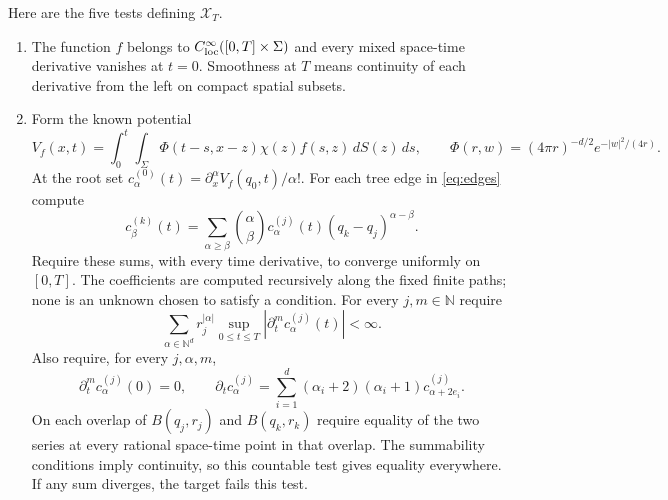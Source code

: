 \documentclass[11pt]{article}
\theoremstyle{remark}
\newcommand{\N}{\mathbb N}
\newcommand{\dt}{\partial_t}
\newcommand{\calX}{\mathcal X}
\begin{document}
Here are the five tests defining $\calX_T$.
\begin{enumerate}[label=\textnormal{(\Alph*)},leftmargin=*]
\item\label{test:A}
The function $f$ belongs to $C^\infty_{\rm loc}([0,T]\times\Sigma)$
and every mixed space-time derivative vanishes at $t=0$.
Smoothness at $T$ means continuity of each derivative from the left on
compact spatial subsets.
\item\label{test:B}
Form the known potential
\begin{equation}\label{eq:potential}
 V_f(x,t)=\int_0^t\int_\Sigma
       \Phi(t-s,x-z)\chi(z)f(s,z)\,dS(z)\,ds,\qquad
 \Phi(r,w)=(4\pi r)^{-d/2}e^{-|w|^2/(4r)}.
\end{equation}
At the root set
$c^{(0)}_\alpha(t)=\partial_x^\alpha V_f(q_0,t)/\alpha!$.
For each tree edge in \eqref{eq:edges} compute
\begin{equation}\label{eq:translation}
 c^{(k)}_\beta(t)=
 \sum_{\alpha\geq\beta}\binom{\alpha}{\beta}
 c^{(j)}_\alpha(t)(q_k-q_j)^{\alpha-\beta}.
\end{equation}
Require these sums, with every time derivative, to converge uniformly on
$[0,T]$. The coefficients are computed recursively along the fixed finite
paths; none is an unknown chosen to satisfy a condition.
For every $j,m\in\N$ require
\begin{equation}\label{eq:budget}
 \sum_{\alpha\in\N^d}r_j^{|\alpha|}
      \sup_{0\leq t\leq T}|\partial_t^m c^{(j)}_\alpha(t)|<\infty.
\end{equation}
Also require, for every $j,\alpha,m$,
\begin{equation}\label{eq:recurrence}
 \partial_t^m c^{(j)}_\alpha(0)=0,\qquad
 \dt c^{(j)}_\alpha=
 \sum_{i=1}^d(\alpha_i+2)(\alpha_i+1)c^{(j)}_{\alpha+2e_i}.
\end{equation}
On each overlap of $B(q_j,r_j)$ and $B(q_k,r_k)$ require equality of
the two series at every rational space-time point in that overlap.
The summability conditions imply continuity, so this countable test gives equality
everywhere. If any sum diverges, the target fails this test.


\end{enumerate}
\end{document}
